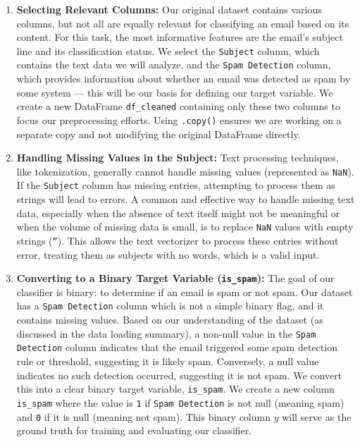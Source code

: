 \documentclass[12pt,letterpaper]{article}
\begin{document}
\begin{enumerate}
    \item \textbf{Selecting Relevant Columns:} Our original dataset contains various columns, but not all are equally relevant for classifying an email based on its content. For this task, the most informative features are the email's subject line and its classification status. We select the \texttt{Subject} column, which contains the text data we will analyze, and the \texttt{Spam Detection} column, which provides information about whether an email was detected as spam by some system --- this will be our basis for defining our target variable. We create a new DataFrame \texttt{df\_cleaned} containing only these two columns to focus our preprocessing efforts. Using \texttt{.copy()} ensures we are working on a separate copy and not modifying the original DataFrame directly.

    \item \textbf{Handling Missing Values in the Subject:} Text processing techniques, like tokenization, generally cannot handle missing values (represented as \texttt{NaN}). If the \texttt{Subject} column has missing entries, attempting to process them as strings will lead to errors. A common and effective way to handle missing text data, especially when the absence of text itself might not be meaningful or when the volume of missing data is small, is to replace \texttt{NaN} values with empty strings (\texttt{''}). This allows the text vectorizer to process these entries without error, treating them as subjects with no words, which is a valid input.

    \item \textbf{Converting to a Binary Target Variable (\texttt{is\_spam}):} The goal of our classifier is binary: to determine if an email is spam or not spam. Our dataset has a \texttt{Spam Detection} column which is not a simple binary flag, and it contains missing values. Based on our understanding of the dataset (as discussed in the data loading summary), a non-null value in the \texttt{Spam Detection} column indicates that the email triggered some spam detection rule or threshold, suggesting it is likely spam. Conversely, a null value indicates no such detection occurred, suggesting it is not spam. We convert this into a clear binary target variable, \texttt{is\_spam}. We create a new column \texttt{is\_spam} where the value is \texttt{1} if \texttt{Spam Detection} is not null (meaning spam) and \texttt{0} if it is null (meaning not spam). This binary column $y$ will serve as the ground truth for training and evaluating our classifier.


\end{enumerate}
\end{document}
